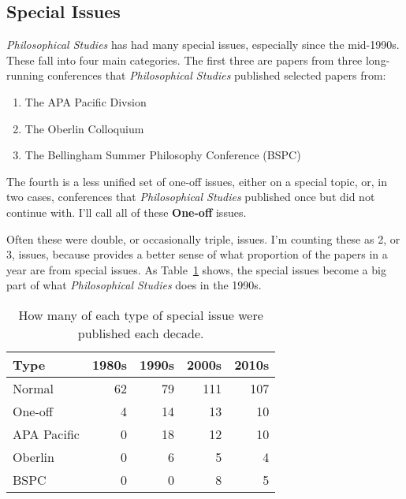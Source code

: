 \documentclass[
  10pt,
  letterpaper,
  DIV=11,
  numbers=noendperiod,
  twoside]{scrartcl}
\providecommand{\tightlist}{%
  \setlength{\itemsep}{0pt}\setlength{\parskip}{0pt}}\usepackage{longtable,booktabs,array}
\begin{document}
\subsection{Special Issues}\label{sec-special-issues}

\emph{Philosophical Studies} has had many special issues, especially
since the mid-1990s. These fall into four main categories. The first
three are papers from three long-running conferences that
\emph{Philosophical Studies} published selected papers from:

\begin{enumerate}
\def\labelenumi{\arabic{enumi}.}
\tightlist
\item
  The APA Pacific Divsion
\item
  The Oberlin Colloquium
\item
  The Bellingham Summer Philosophy Conference (BSPC)
\end{enumerate}

The fourth is a less unified set of one-off issues, either on a special
topic, or, in two cases, conferences that \emph{Philosophical Studies}
published once but did not continue with. I'll call all of these
\textbf{One-off} issues.

Often these were double, or occasionally triple, issues. I'm counting
these as 2, or 3, issues, because provides a better sense of what
proportion of the papers in a year are from special issues. As
Table~\ref{tbl-issues-by-decade} shows, the special issues become a big
part of what \emph{Philosophical Studies} does in the 1990s.

\begin{longtable}[]{@{}lrrrr@{}}

\caption{\label{tbl-issues-by-decade}How many of each type of special
issue were published each decade.}

\tabularnewline

\toprule\noalign{}
Type & 1980s & 1990s & 2000s & 2010s \\
\midrule\noalign{}
\endhead
\bottomrule\noalign{}
\endlastfoot
Normal & 62 & 79 & 111 & 107 \\
One-off & 4 & 14 & 13 & 10 \\
APA Pacific & 0 & 18 & 12 & 10 \\
Oberlin & 0 & 6 & 5 & 4 \\
BSPC & 0 & 0 & 8 & 5 \\

\end{longtable}
\end{document}
